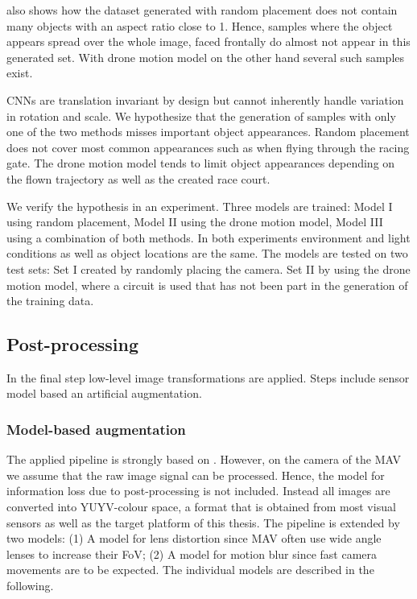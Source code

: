  also shows how the dataset generated with random placement does not contain many objects with an aspect ratio close to 1. Hence, samples where the object appears spread over the whole image, faced frontally do almost not appear in this generated set. With drone motion model on the other hand several such samples exist.

\acp{CNN} are translation invariant by design but cannot inherently handle variation in rotation and scale. We hypothesize that the generation of samples with only one of the two methods misses important object appearances. Random placement does not cover most common appearances such as when flying through the racing gate. The drone motion model tends to limit object appearances depending on the flown trajectory as well as the created race court.

We verify the hypothesis in an experiment. Three models are trained: Model I using random placement, Model II using the drone motion model, Model III using a combination of both methods. In both experiments environment and light conditions as well as object locations are the same. The models are tested on two test sets: Set I created by randomly placing the camera. Set II by using the drone motion model, where a circuit is used that has not been part in the generation of the training data.


\subsection{Post-processing}

In the final step low-level image transformations are applied. Steps include sensor model based an artificial augmentation.

\subsubsection{Model-based augmentation}

The applied pipeline is strongly based on \cite{Carlson2018}. However, on the camera of the \ac{MAV} we assume that the raw image signal can be processed. Hence, the model for information loss due to post-processing is not included. Instead all images are converted into YUYV-colour space, a format that is obtained from most visual sensors as well as the target platform of this thesis. The pipeline is extended by two models: (1) A model for lens distortion since \ac{MAV} often use wide angle lenses to increase their \ac{FoV}; (2) A model for motion blur since fast camera movements are to be expected. The individual models are described in the following.

